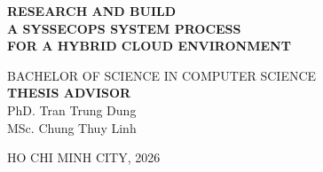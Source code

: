 \begin{titlepage}
\begin{center}

{ \Large \bfseries RESEARCH AND BUILD\\A SYSSECOPS SYSTEM PROCESS\\FOR A HYBRID CLOUD ENVIRONMENT \\[3cm]} 


\large BACHELOR OF SCIENCE IN COMPUTER SCIENCE\\

\textbf{THESIS ADVISOR}\\
PhD. Tran Trung Dung\\
MSc. Chung Thuy Linh


\vfill
HO CHI MINH CITY, 2026

\end{center}
\end{titlepage}
